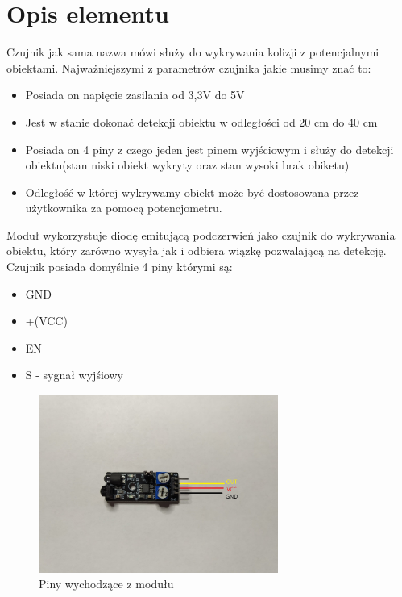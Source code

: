 \documentclass[11pt, a4paper]{article}
\institute{Instytut Robotyki i Inteligencji Maszynowej}
\begin{document}
\newpage

\section*{Opis elementu} 
Czujnik jak sama nazwa mówi służy do wykrywania kolizji z potencjalnymi obiektami. Najważniejszymi z parametrów czujnika jakie musimy znać to:
\begin{itemize}
\item Posiada on napięcie zasilania od 3,3V do 5V
\item Jest w stanie dokonać detekcji obiektu w odległości od 20 cm do 40 cm
\item Posiada on 4 piny z czego jeden jest pinem wyjściowym i służy do detekcji obiektu(stan niski obiekt wykryty oraz stan wysoki brak obiketu)
\item Odległość w której wykrywamy obiekt może być dostosowana przez użytkownika za pomocą potencjometru.
\end{itemize}

Moduł wykorzystuje diodę emitującą podczerwień jako czujnik do wykrywania obiektu, który zarówno wysyła jak i odbiera wiązkę pozwalającą na detekcję.  Czujnik posiada domyślnie 4 piny którymi są:
\begin{itemize}
\item GND
\item +(VCC)
\item EN
\item S - sygnał wyjśiowy
\end{itemize}
\begin{figure}[H]
    \centering
    \includegraphics[width=0.7\textwidth]{fig/KY-032/polaczenie_modulu/KY-032_Pins.jpg}
    \caption{Piny wychodzące z modułu}
\end{figure}
\end{document}
